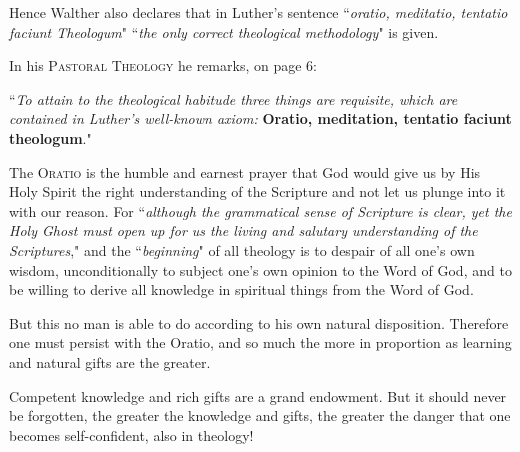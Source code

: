 Hence Walther also declares that in Luther's sentence ``\textit{oratio, meditatio, tentatio faciunt Theologum}" ``\textit{the only correct theological methodology}" is given.

In his \textsc{Pastoral Theology} he remarks, on page 6: \begin{displayquote}``\textit{To attain to the theological habitude three things are requisite, which are contained in Luther's well-known axiom:}\textbf{ Oratio, meditation, tentatio faciunt theologum}."\end{displayquote}

The \textsc{Oratio} is the humble and earnest prayer that God would give us by His Holy Spirit the right understanding of the Scripture and not let us plunge into it with our reason. For ``\textit{although the grammatical sense of Scripture is clear, yet the Holy Ghost must open up for us the living and salutary understanding of the Scriptures}," and the ``\textit{beginning}" of all theology is to despair of all one's own wisdom, unconditionally to subject one's own opinion to the Word of God, and to be willing to derive all knowledge in spiritual things from the Word of God.

But this no man is able to do according to his own natural disposition. Therefore one must persist with the Oratio, and so much the more in proportion as learning and natural gifts are the greater. \\\begin{fancyquotes}Competent knowledge and rich gifts are a grand endowment. But it should never be forgotten, the greater the knowledge and gifts, the greater the danger that one becomes self-confident, also in theology!\end{fancyquotes}

